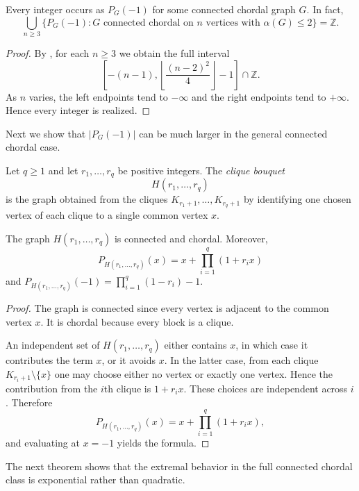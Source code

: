 \documentclass[12pt]{amsart}
\theoremstyle{plain}
\theoremstyle{definition}
\begin{document}
\begin{cor}\label{cor:every_integer_chordal}
Every integer occurs as \(P_G(-1)\) for some connected chordal graph \(G\).
In fact,
\[
\bigcup_{n\geq 3}
\{ P_G(-1): G \text{ connected chordal on } n \text{ vertices with }
\alpha(G)\leq 2 \}
=
\mathbb Z.
\]
\end{cor}

\begin{proof}
By , for each \(n\geq 3\) we obtain the full interval
\[
\left[
-(n-1),
\left\lfloor \frac{(n-2)^2}{4}\right\rfloor-1
\right]\cap \mathbb Z.
\]
As \(n\) varies, the left endpoints tend to \(-\infty\) and the right endpoints
tend to \(+\infty\). Hence every integer is realized.
\end{proof}

Next we  show that $|P_G(-1)|$ can be much larger in the general connected chordal case. 


\begin{defn}\label{defn:clique_bouquet}
Let \(q\geq 1\) and let \(r_1,\dots,r_q\) be positive integers. The
\emph{clique bouquet}
\[
H(r_1,\dots,r_q)
\]
is the graph obtained from the cliques \(K_{r_1+1},\dots,K_{r_q+1}\) by
identifying one chosen vertex of each clique to a single common vertex \(x\).
\end{defn}

\begin{prop}\label{prop:clique_bouquet_formula}
The graph \(H(r_1,\dots,r_q)\) is connected and chordal. Moreover,
\[
P_{H(r_1,\dots,r_q)}(x)=x+\prod_{i=1}^q (1+r_i x)
\]
and  \(P_{H(r_1,\dots,r_q)}(-1)=\prod_{i=1}^q (1-r_i)-1\).
\end{prop}

\begin{proof}
The graph is connected since every vertex is adjacent to the common vertex \(x\).
It is chordal because every block is a clique.

An independent set of \(H(r_1,\dots,r_q)\) either contains \(x\), in which case
it contributes the term \(x\), or it avoids \(x\). In the latter case, from each
clique \(K_{r_i+1}\setminus \{x\}\) one may choose either no vertex or exactly one
vertex. Hence the contribution from the \(i\)th clique is \(1+r_i x\). These
choices are independent across \(i\). Therefore
\[
P_{H(r_1,\dots,r_q)}(x)=x+\prod_{i=1}^q (1+r_i x),
\]
and evaluating at \(x=-1\) yields the formula.
\end{proof}

The next theorem shows that the extremal behavior in the full connected chordal
class is exponential rather than quadratic.
\end{document}
